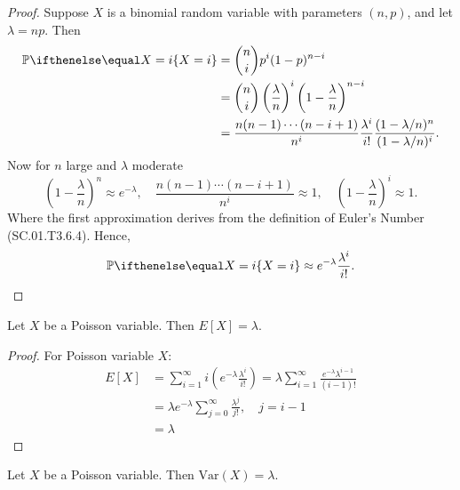 \documentclass[a4paper,8pt]{article}
\begin{document}
\begin{outline}
      \begin{proof}
        Suppose \(X\) is a binomial random variable with parameters \((n,p)\), and let \(\lambda = np\). Then
        \begin{align*}
          \bbp[X=i] &= \binom{n}{i}p^i(1-p)^{n-i} \\
                    &= \binom{n}{i}\left(\frac{\lambda}{n}\right)^i\left(1-\frac{\lambda}{n}\right)^{n-i} \\
                    &= \frac{n(n-1)\cdots(n-i+1)}{n^i}\frac{\lambda^i}{i!}\frac{(1-\lambda/n)^n}{(1-\lambda/n)^i}\text{.}
        \end{align*}
        Now for \(n\) large and \(\lambda\) moderate
        \[
          \left(1-\frac{\lambda}{n}\right)^n \approx e^{-\lambda},\quad
          \frac{n(n-1)\cdots(n-i+1)}{n^i}\approx 1,\quad
          \left(1-\frac{\lambda}{n}\right)^i \approx 1\text{.}
        \]
        Where the first approximation derives from the definition of Euler's Number (SC.01.T3.6.4). Hence,
        \[\bbp[X=i] \approx e^{-\lambda}\frac{\lambda^i}{i!}\text{.} \]
      \end{proof}

      Let \(X\) be a Poisson variable. Then \(E[X] = \lambda\).

      \pagebreak
      \begin{proof}
        For Poisson variable \(X\):
        \begin{align*}
          E[X] &= \sum_{i=1}^{\infty}i\left(e^{-\lambda}\frac{\lambda^i}{i!}\right)
               = \lambda\sum_{i=1}^{\infty}\frac{e^{-\lambda}\lambda^{i-1}}{(i-1)!} \\
               &= \lambda e^{-\lambda}\sum_{j=0}^{\infty}\frac{\lambda^j}{j!},\quad j=i-1 \\
               &= \lambda
        \end{align*}
      \end{proof}

      Let \(X\) be a Poisson variable. Then \(\text{Var}(X) = \lambda\).


\end{outline}
\end{document}
